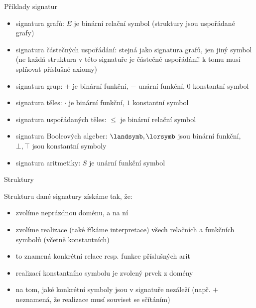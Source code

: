 \documentclass{beamer}
\begin{document}
\begin{frame}{Příklady signatur}

    \begin{itemize}
        \item {} signatura \alert{grafů}: $E$ je binární relační symbol (struktury jsou uspořádané grafy)\pause
        \item \myexampleinline{
        $\langle \leq \rangle$
        } signatura \alert{částečných uspořádání}: stejná jako signatura grafů, jen jiný symbol \pause (ne každá struktura v této signatuře je částečné uspořádání! k tomu musí splňovat příslušné \alert{axiomy})\pause
        \item \myexampleinline{
        $\langle +, -, 0\rangle$
        } signatura \alert{grup}: $+$ je binární funkční, $-$ unární funkční, $0$ konstantní symbol\pause
        \item {} signatura \alert{těles}: $\cdot$ je binární funkční, $1$ konstantní symbol\pause
        \item {} signatura \alert{uspořádaných těles}: $\leq$ je binární relační symbol\pause
        \item \myexampleinline{
        $\langle -,\landsymb,\lorsymb,\bot,\top\rangle$
        } signatura \alert{Booleových algeber}: $\landsymb,\lorsymb$ jsou binární funkční, $\bot,\top$ jsou konstantní symboly\pause
        \item {} signatura \alert{aritmetiky}: $S$ je unární funkční symbol
    \end{itemize}
    
\end{frame}


\begin{frame}{Struktury}

    \alert{Strukturu} dané signatury získáme tak, že: \pause
    \begin{itemize}
        \item zvolíme neprázdnou \alert{doménu}, a na ní \pause
        \item zvolíme \alert{realizace} (také říkáme \alert{interpretace}) všech relačních a funkčních symbolů (včetně konstantních) \pause
        \item to znamená \alert{konkrétní} relace resp. funkce příslušných arit \pause
        \item realizací konstantního symbolu je zvolený prvek z domény \pause
        \item na tom, jaké konkrétní symboly jsou v signatuře nezáleží \pause (např. $+$ neznamená, že realizace musí souviset se sčítáním)
    \end{itemize}

\end{frame}
\end{document}
